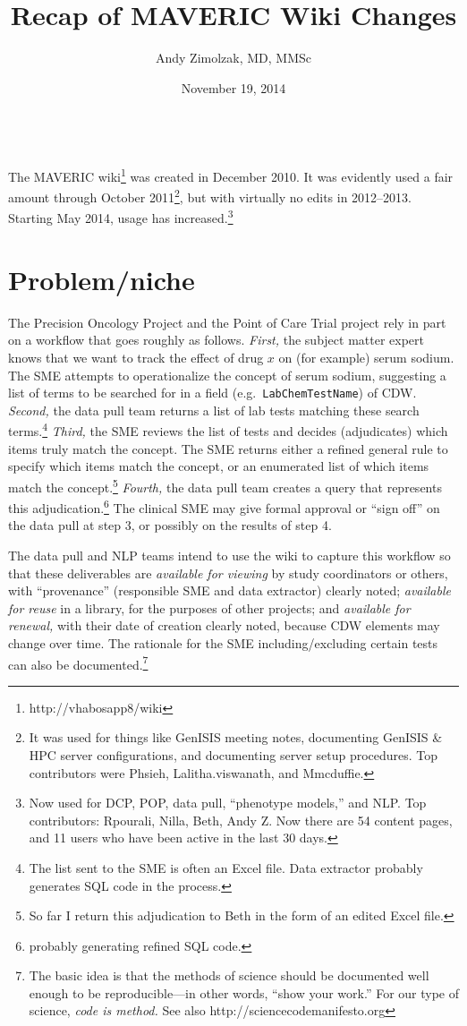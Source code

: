 \documentclass{tufte-handout}
\title{Recap of MAVERIC Wiki Changes}
\author{Andy Zimolzak, MD, MMSc}
\date{November 19, 2014}
\begin{document}
\maketitle

~\\

The MAVERIC wiki\footnote{http://vhabosapp8/wiki} was created in
December 2010. It was evidently used a fair amount through October
2011\footnote{It was used for things like GenISIS meeting notes,
  documenting GenISIS \& HPC server configurations, and documenting
  server setup procedures. Top contributors were Phsieh,
  Lalitha.viswanath, and Mmcduffie.}, but with virtually no edits in
2012--2013. Starting May 2014, usage has increased.\footnote{Now
  used for DCP, POP, data pull, ``phenotype models,'' and NLP. Top
  contributors: Rpourali, Nilla, Beth, Andy Z. Now there are 54
  content pages, and 11 users who have been active in the last 30
  days.}

\section{Problem/niche}

The Precision Oncology Project and the Point of Care Trial project
rely in part on a workflow that goes roughly as follows. \emph{First,}
the subject matter expert knows that we want to track the effect of
drug $x$ on (for example) serum sodium. The SME attempts to
operationalize the concept of serum sodium, suggesting a list of terms
to be searched for in a field (e.g.\ \texttt{LabChemTestName}) of CDW.
\emph{Second,} the data pull team returns a list of lab tests matching
these search terms.\footnote{The list sent to the SME is often an
  Excel file. Data extractor probably generates SQL code in the
  process.} \emph{Third,} the SME reviews the list of tests and
decides (adjudicates) which items truly match the concept. The SME
returns either a refined general rule to specify which items match the
concept, or an enumerated list of which items match the
concept.\footnote{So far I return this adjudication to Beth in the
  form of an edited Excel file.} \emph{Fourth,} the data pull team
creates a query that represents this adjudication.\footnote{probably
  generating refined SQL code.} The clinical SME may give formal
approval or ``sign off'' on the data pull at step 3, or possibly on
the results of step 4.

The data pull and NLP teams intend to use the wiki to capture this
workflow so that these deliverables are \emph{available for viewing}
by study coordinators or others, with ``provenance'' (responsible SME
and data extractor) clearly noted; \emph{available for reuse} in a
library, for the purposes of other projects; and \emph{available for
  renewal,} with their date of creation clearly noted, because CDW
elements may change over time. The rationale for the SME
including/excluding certain tests can also be documented.\footnote{The
  basic idea is that the methods of science should be documented well
  enough to be reproducible---in other words, ``show your work.'' For
  our type of science, \emph{code is method.} See also
  http://sciencecodemanifesto.org}
\end{document}
